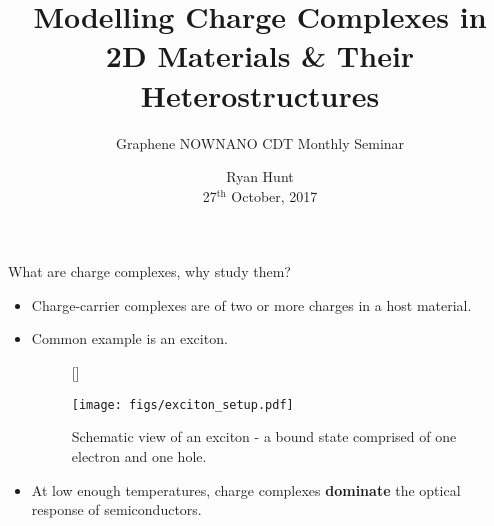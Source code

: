 \documentclass[12pt, pdf, hyperref={draft}, usenames, dvipsnames]{beamer}
\title{Modelling Charge Complexes in \\
       2D Materials \& Their Heterostructures}
\subtitle{Graphene NOWNANO CDT Monthly Seminar}
\author{Ryan Hunt \\
27$^{\text{th}}$ October, 2017}
\date{}
\newcommand{\blue}[1]{{\bf\color{NavyBlue}{#1}}}
\begin{document}
\begin{frame}[plain]
  \titlepage\end{frame}







\begin{frame}{What are charge complexes, why study them?}

\begin{itemize}
  \item Charge-carrier complexes are \blue{bound states} of two or more charges in a host
  material.
  \item Common example is an exciton.

  \begin{figure}[H]
    [\FBwidth]
    {\caption{Schematic view of an exciton - a bound state comprised of one
    electron and one hole.}\label{fig:exc_schematic}}
    {\texttt{[image: figs/exciton\_setup.pdf]}}
  \end{figure}

  \item At low enough temperatures, charge complexes {\bf dominate} the optical
  response of semiconductors.

\end{itemize}

\end{frame}
\end{document}
